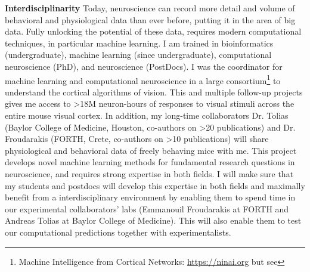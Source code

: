 \documentclass[B2,COG]{ercgrant}
\begin{document}
\textbf{Interdisciplinarity} 
Today, neuroscience can record more detail and volume  of  behavioral and physiological data than ever before, putting it in the area of big data. 
Fully unlocking the potential of these data, requires modern computational techniques, in particular machine learning. 
I am trained in bioinformatics (undergraduate), machine learning (since undergraduate), computational neuroscience (PhD), and neuroscience (PostDocs).
I was the coordinator for machine learning and computational neuroscience in a large consortium\footnote{Machine Intelligence from Cortical Networks: \url{https://ninai.org} but see } to understand the cortical algorithms of vision.
This and multiple follow-up projects gives me access to >18M neuron-hours of responses to visual stimuli across the entire mouse visual cortex. In addition, my long-time collaborators Dr. Tolias (Baylor College of Medicine, Houston, co-authors on >20  publications) and Dr. Froudarakis (FORTH, Crete, co-authors on >10 publications) will share physiological and behavioral data of freely behaving mice with me. 
This project develops novel machine learning methods for fundamental research questions in neuroscience, and requires strong expertise in both fields. 
I will make sure that my students and postdocs will develop this expertise in both fields and maximally benefit from a interdisciplinary environment by enabling them to spend time in our experimental collaborators’ labs (Emmanouil Froudarakis at FORTH and Andreas Tolias at Baylor College of Medicine).
This will also enable them to test our computational predictions together with experimentalists.
\end{document}
